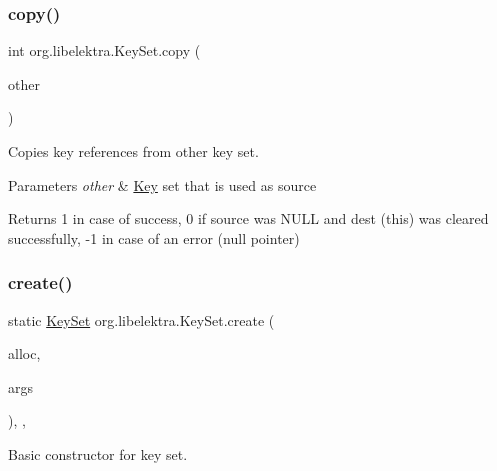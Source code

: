 \subsubsection{\texorpdfstring{copy()}{copy()}}
{\footnotesize\ttfamily int org.\+libelektra.\+Key\+Set.\+copy (\begin{DoxyParamCaption}\item[{final \hyperlink{classorg_1_1libelektra_1_1KeySet}{Key\+Set}}]{other }\end{DoxyParamCaption})\hspace{0.3cm}{\ttfamily [inline]}}



Copies key references from other key set. 


\begin{DoxyParams}{Parameters}
{\em other} & \hyperlink{classorg_1_1libelektra_1_1Key}{Key} set that is used as source \\
\hline
\end{DoxyParams}
\begin{DoxyReturn}{Returns}
1 in case of success, 0 if source was N\+U\+LL and dest (this) was cleared successfully, -\/1 in case of an error (null pointer) 
\end{DoxyReturn}
\mbox{\label{classorg_1_1libelektra_1_1KeySet_ae3f1cd9ac1a4fd2ef7d16e6c320bc6a3}} 
\subsubsection{\texorpdfstring{create()}{create()}\hspace{0.1cm}{\footnotesize\ttfamily [1/2]}}
{\footnotesize\ttfamily static \hyperlink{classorg_1_1libelektra_1_1KeySet}{Key\+Set} org.\+libelektra.\+Key\+Set.\+create (\begin{DoxyParamCaption}\item[{final int}]{alloc,  }\item[{final Object...}]{args }\end{DoxyParamCaption})\hspace{0.3cm}{\ttfamily [inline]}, {\ttfamily [static]}, {\ttfamily [protected]}}



Basic constructor for key set. 


